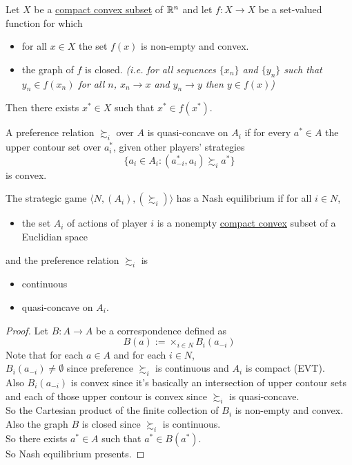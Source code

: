 \documentclass[11pt]{article}
\begin{document}
		\begin{lemma}
			Let $X$ be a \ul{compact convex subset} of $\mathbb{R}^n$ and let $f: X \to X$ be a set-valued function for which
			\begin{itemize}
				\item for all $x \in X$ the set $f(x)$ is non-empty and convex.
				\item the graph of $f$ is closed. \emph{(i.e. for all sequences $\{x_n\}$ and $\{y_n\}$ such that $y_n \in f(x_n)$ for all $n$, $x_n \to x$ and $y_n \to y$ then $y \in f(x)$)}
			\end{itemize}
			Then there exists $x^* \in X$ such that $x^* \in f(x^*)$.
		\end{lemma}
		
		\begin{definition}[pg.20]
			A preference relation $\succsim_i$ over $A$ is quasi-concave on $A_i$ if for every $a^* \in A$ the upper contour set over $a^*_i$, given other players' strategies
			\[
				\{a_i \in A_i: (a^*_{-i}, a_i) \succsim_i a^*\}
			\]
			is convex.
		\end{definition}
		
		\begin{proposition}[20.3]
			The strategic game $\langle N, (A_i), (\succsim_i) \rangle$ has a Nash equilibrium if for all $i \in N$,
			\begin{itemize}
				\item the set $A_i$ of actions of player $i$ is a nonempty \ul{compact convex} subset of a Euclidian space
			\end{itemize}
			and the preference relation $\succsim_i$ is
			\begin{itemize}
				\item continuous
				\item quasi-concave on $A_i$.
			\end{itemize}
		\end{proposition}
		
		\begin{proof}
			Let $B: A \to A$ be a correspondence defined as 
			\[
				B(a) := \times_{i \in N} B_i(a_{-i})
			\]
			Note that for each $a \in A$ and for each $i \in N$, \\
			$B_i(a_{-i}) \neq \emptyset$ since preference $\succsim_i$ is continuous and $A_i$ is compact (EVT). \\
			Also $B_i(a_{-i})$ is convex since it's basically an intersection of  upper contour sets and each of those upper contour is convex since $\succsim_i$ is quasi-concave. \\
			So the Cartesian product of the finite collection of $B_i$ is non-empty and convex. \\
			Also the graph $B$ is closed since $\succsim_i$ is continuous. \\
			So there exists $a^* \in A$ such that $a^* \in B(a^*)$. \\
			So Nash equilibrium presents.
		\end{proof}
\end{document}
